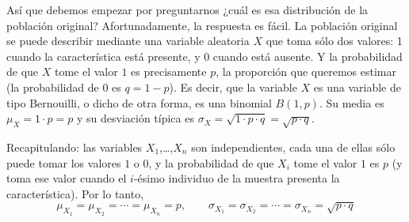 \begin{itemize}
        Así que debemos empezar por preguntarnos ¿cuál es esa distribución de la población original? Afortunadamente, la respuesta es fácil. La población original se puede describir mediante una variable aleatoria $X$ que toma sólo dos valores: 1 cuando la característica está presente, y 0 cuando está ausente. Y la probabilidad de que $X$ tome el valor $1$ es precisamente $p$, la proporción que queremos estimar (la probabilidad de $0$ es $q=1-p$). Es decir, que la variable $X$ es una variable de tipo Bernouilli, o dicho de otra forma, es una binomial $B(1,p)$. Su media es $\mu_X=1\cdot p=p$ y su desviación típica es $\sigma_X=\sqrt{1\cdot p\cdot q}=\sqrt{p\cdot q}$.

        Recapitulando: las variables $X_1$,\ldots,$X_n$ son independientes, cada una de ellas sólo puede tomar los valores $1$ o $0$, y la probabilidad de que $X_i$ tome el valor $1$ es $p$ (y toma ese valor cuando el $i$-ésimo individuo de la muestra presenta la característica). Por lo tanto,
        \[\mu_{X_1}=\mu_{X_2}=\cdots=\mu_{X_n}=p,\qquad \sigma_{X_1}=\sigma_{X_2}=\cdots=\sigma_{X_n}=\sqrt{p\cdot q}\]


\end{itemize}
